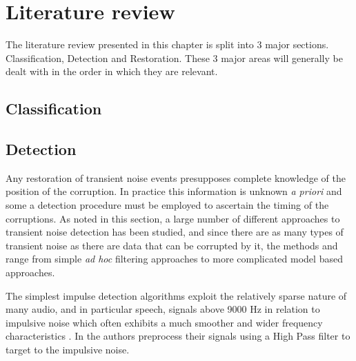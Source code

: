 \chapter{Literature review}

\ifpdf
    \graphicspath{{Chapter2_LitReview/Chapter2Figs/PNG/}{Chapter2_LitReview/Chapter2Figs/PDF/}{Chapter2_LitReview/Chapter2Figs/}{Chapter2_LitReview/Chapter2Figs/Classification/}{Chapter2_LitReview/Chapter2Figs/Detection/}{Chapter2_LitReview/Chapter2Figs/Restoration}}
\else
    \graphicspath{{Chapter2_LitReview/Chapter2Figs/EPS/}{Chapter2_LitReview/Chapter2Figs/}}
\fi

The literature review presented in this chapter is split into 3 major sections. Classification, Detection and Restoration. These 3 major areas will generally be dealt with in the order in which they are relevant.

\section{Classification}\label{sec:LitRev_Classification}

\section{Detection}\label{sec:LitRev_Detection}

Any restoration of transient noise events presupposes complete knowledge of the position of the corruption. In practice this information is unknown \emph{a priori} and some a detection procedure must be employed to ascertain the timing of the corruptions. As noted in this section, a large number of different approaches to transient noise detection has been studied, and since there are as many types of transient noise as there are data that can be corrupted by it, the methods and range from simple \emph{ad hoc} filtering approaches to more complicated model based approaches.



The simplest impulse detection algorithms exploit the relatively sparse nature of many audio, and in particular speech, signals above 9000 Hz in relation to impulsive noise which often exhibits a much smoother and wider frequency characteristics \cite{Subramanya2007}. In \cite{Kasparis1993}\cite{US6795559} the authors preprocess their signals using a High Pass filter to target to the impulsive noise.

